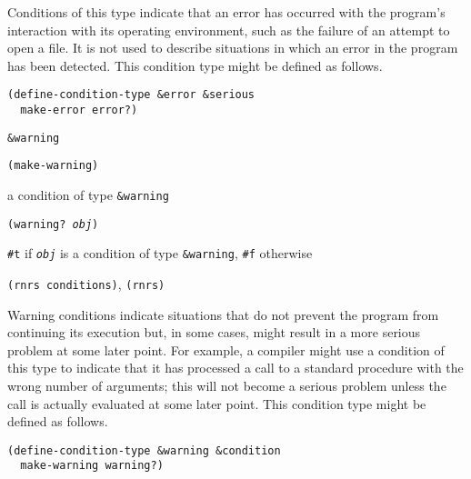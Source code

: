 Conditions of this type indicate that an error has occurred with
the program's interaction with its operating environment, such as
the failure of an attempt to open a file.
It is not used to describe situations in which an error in the
program has been detected.
This condition type might be defined as follows.

\begin{alltt}
(define-condition-type \&{}error \&{}serious
  make-error error?)
\end{alltt}

\begin{description}

\label{exceptions_s23}\item[syntax] \texttt{\&{}warning}



\item[procedure] \texttt{(make-warning)}



\item[returns] a condition of type \texttt{\&{}warning}


\item[procedure] \texttt{(warning? \textit{obj})}



\item[returns] \texttt{\#{}t} if \texttt{\textit{obj}} is a condition of type \texttt{\&{}warning}, \texttt{\#{}f} otherwise


\item[libraries] \texttt{(rnrs conditions)}, \texttt{(rnrs)}
\end{description}



Warning conditions indicate situations that do not prevent the program
from continuing its execution but, in some cases, might result in a more
serious problem at some later point.
For example, a compiler might use a condition of this type to indicate
that it has processed a call to a standard procedure with the wrong
number of arguments; this will not become a serious problem unless the
call is actually evaluated at some later point.
This condition type might be defined as follows.

\begin{alltt}
(define-condition-type \&{}warning \&{}condition
  make-warning warning?)
\end{alltt}

